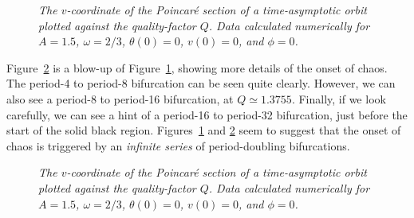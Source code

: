 \begin{figure}
\centerline{}
\caption{\em The $v$-coordinate of the Poincar\'{e} section of a time-asymptotic orbit
plotted against the quality-factor $Q$. Data
 calculated numerically for
$A=1.5$, $\omega=2/3$, $\theta(0)=0$, $v(0)=0$, and $\phi=0$.}\label{f34}
\end{figure}

Figure~\ref{f35} is a blow-up of Figure~\ref{f34}, showing more details of the onset of
chaos. The period-4 to period-8 bifurcation can be seen quite clearly. However,
we can also see a period-8 to period-16 bifurcation, at $Q\simeq 1.3755$. Finally,
if we look carefully, we can see a hint of a period-16 to period-32 bifurcation, just
before the start of the solid black region.
 Figures~\ref{f34} and \ref{f35} seem to suggest that the
onset of chaos is triggered by an {\em infinite series}\/ of period-doubling bifurcations.

\begin{figure}
\centerline{}
\caption{\em The $v$-coordinate of the Poincar\'{e} section of a time-asymptotic orbit
plotted against the quality-factor $Q$. Data
calculated numerically for
$A=1.5$, $\omega=2/3$, $\theta(0)=0$, $v(0)=0$,
 and $\phi=0$.}\label{f35}
\end{figure}

